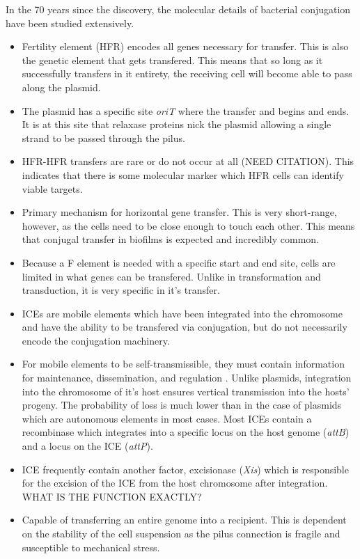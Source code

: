 In the 70 years since the discovery, the molecular details of bacterial
conjugation have been studied extensively. 
\begin{itemize}
	\item Fertility element (HFR) encodes all genes necessary for transfer.
		This is also the genetic element that gets transfered. This
		means that so long as it successfully transfers in it entirety,
		the receiving cell will become able to pass along the plasmid. 
	\item The plasmid has a specific site \textit{oriT} where the transfer
		and begins and ends. It is at this site that relaxase proteins
		nick the plasmid allowing a single strand to be passed through
		the pilus.
	\item HFR-HFR transfers are rare or do not occur at all (NEED CITATION).
		This indicates that there is some molecular marker which HFR
		cells can identify viable targets.
	\item Primary mechanism for horizontal gene transfer. This is very
		short-range, however, as the cells need to be close enough to
		touch each other. This means that conjugal transfer in biofilms
		is expected and incredibly common. 
	\item Because a F element is needed with a specific start and end site,
		cells are limited in what genes can be transfered. Unlike in
		transformation and transduction, it is very specific in it's transfer. 
	\item ICEs are mobile elements which have been integrated into the
		chromosome and have the ability to be transfered via
		conjugation, but do not necessarily encode the conjugation
		machinery. 
	\item For mobile elements to be self-transmissible, they must contain
		information for maintenance, dissemination, and regulation
		\cite{Burrus:2004ca}. Unlike plasmids, integration into the
		chromosome of it's host ensures vertical transmission into the
		hosts' progeny. The probability of loss is much lower than in
		the case of plasmids which are autonomous elements in most
		cases. Most ICEs contain a recombinase which integrates into a
		specific locus on the host genome (\textit{attB}) and a locus on
		the ICE (\textit{attP})\cite{Burrus:2004ca}.
	\item ICE frequently contain another factor, excisionase (\textit{Xis}) which is
		responsible for the excision of the ICE from the host chromosome
		after integration. WHAT IS THE FUNCTION EXACTLY?
	\item Capable of transferring an entire genome into a recipient. This is
		dependent on the stability of the cell suspension as the pilus
		connection is fragile and susceptible to mechanical stress.


\end{itemize}

